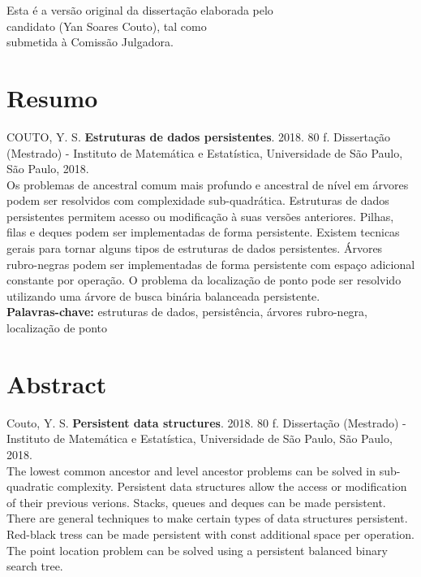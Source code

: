 \documentclass[11pt,oneside,a4paper, openany]{book}
\begin{document}
    \vskip 2cm

    \begin{flushright}
    Esta é a versão original da dissertação elaborada pelo\\
    candidato (Yan Soares Couto), tal como \\
    submetida à Comissão Julgadora.
    \end{flushright}

\pagebreak


\chapter*{Resumo}

\noindent COUTO, Y. S. \textbf{Estruturas de dados persistentes}.
2018. 80 f.
Dissertação (Mestrado) - Instituto de Matemática e Estatística,
Universidade de São Paulo, São Paulo, 2018.
\\

Os problemas de ancestral comum mais profundo e ancestral de nível em árvores podem ser resolvidos com complexidade sub-quadrática. Estruturas de dados persistentes permitem acesso ou modificação à suas versões anteriores. Pilhas, filas e deques podem ser implementadas de forma persistente. Existem tecnicas gerais para tornar alguns tipos de estruturas de dados persistentes. Árvores rubro-negras podem ser implementadas de forma persistente com espaço adicional constante por operação. O problema da localização de ponto pode ser resolvido utilizando uma árvore de busca binária balanceada persistente.
\\

\noindent \textbf{Palavras-chave:} estruturas de dados, persistência, árvores rubro-negra, localização de ponto

\chapter*{Abstract}
\noindent Couto, Y. S. \textbf{Persistent data structures}. 
2018. 80 f.
Dissertação (Mestrado) - Instituto de Matemática e Estatística,
Universidade de São Paulo, São Paulo, 2018.
\\


The lowest common ancestor and level ancestor problems can be solved in sub-quadratic complexity. Persistent data structures allow the access or modification of their previous verions. Stacks, queues and deques can be made persistent. There are general techniques to make certain types of data structures persistent. Red-black tress can be made persistent with const additional space per operation. The point location problem can be solved using a persistent balanced binary search tree.
\\
\end{document}

